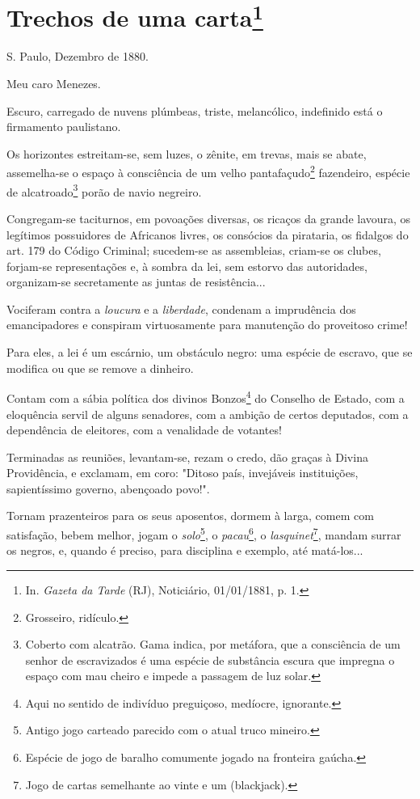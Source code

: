 \chapter{Trechos de uma carta\footnote[*]{In. \emph{Gazeta da Tarde}
  (RJ), Noticiário, 01/01/1881, p. 1.}}

S. Paulo, Dezembro de 1880.

Meu caro Menezes.

Escuro, carregado de nuvens plúmbeas, triste, melancólico, indefinido
está o firmamento paulistano.

Os horizontes estreitam-se, sem luzes, o zênite, em trevas, mais se
abate, assemelha-se o espaço à consciência de um velho
pantafaçudo\footnote{Grosseiro, ridículo.} fazendeiro, espécie de
alcatroado\footnote{Coberto com alcatrão. Gama indica, por metáfora,
  que a consciência de um senhor de escravizados é uma espécie de
  substância escura que impregna o espaço com mau cheiro e impede a
  passagem de luz solar.} porão de navio negreiro.

Congregam-se taciturnos, em povoações diversas, os ricaços da grande
lavoura, os legítimos possuidores de Africanos livres, os consócios da
pirataria, os fidalgos do art. 179 do Código Criminal; sucedem-se as
assembleias, criam-se os clubes, forjam-se representações e, à sombra da
lei, sem estorvo das autoridades, organizam-se secretamente as juntas de
resistência...

Vociferam contra a \emph{loucura} e a \emph{liberdade}, condenam a
imprudência dos emancipadores e conspiram virtuosamente para manutenção
do proveitoso crime!

Para eles, a lei é um escárnio, um obstáculo negro: uma espécie de
escravo, que se modifica ou que se remove a dinheiro.

Contam com a sábia política dos divinos Bonzos\footnote{Aqui no
  sentido de indivíduo preguiçoso, medíocre, ignorante.} do Conselho de
Estado, com a eloquência servil de alguns senadores, com a ambição de
certos deputados, com a dependência de eleitores, com a venalidade de
votantes!

Terminadas as reuniões, levantam-se, rezam o credo, dão graças à Divina
Providência, e exclamam, em coro: "Ditoso país, invejáveis instituições,
sapientíssimo governo, abençoado povo!".

Tornam prazenteiros para os seus aposentos, dormem à larga, comem com
satisfação, bebem melhor, jogam o \emph{solo}\footnote{Antigo jogo
  carteado parecido com o atual truco mineiro.}, o
\emph{pacau}\footnote{Espécie de jogo de baralho comumente jogado na
  fronteira gaúcha.}, o \emph{lasquinet}\footnote{Jogo de cartas
  semelhante ao vinte e um (blackjack).}, mandam surrar os negros, e,
quando é preciso, para disciplina e exemplo, até matá-los...

